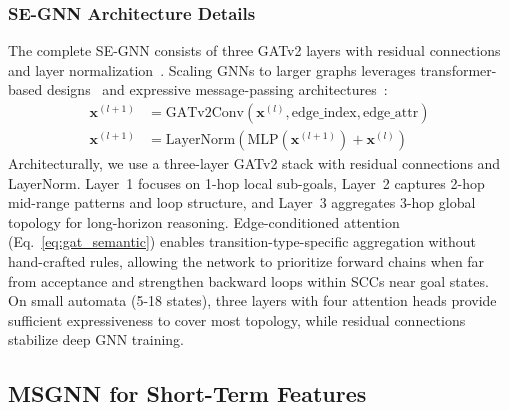 \documentclass[journal]{IEEEtran}
\begin{document}
\subsubsection{SE-GNN Architecture Details}

The complete SE-GNN consists of three GATv2 layers with residual connections~\citep{He2016} and layer normalization~\citep{Ba2016}. Scaling GNNs to larger graphs leverages transformer-based designs~\citep{rampavsek2022recipe} and expressive message-passing architectures~\citep{brandstetter2022message}:
\begin{align}
\mathbf{x}^{(l+1)} &= \text{GATv2Conv}(\mathbf{x}^{(l)}, \text{edge\_index}, \text{edge\_attr}) \\
\mathbf{x}^{(l+1)} &= \text{LayerNorm}(\text{MLP}(\mathbf{x}^{(l+1)}) + \mathbf{x}^{(l)})
\end{align}
Architecturally, we use a three-layer GATv2 stack with residual connections and LayerNorm. Layer~1 focuses on 1-hop local sub-goals, Layer~2 captures 2-hop mid-range patterns and loop structure, and Layer~3 aggregates 3-hop global topology for long-horizon reasoning. Edge-conditioned attention (Eq.~\ref{eq:gat_semantic}) enables transition-type-specific aggregation without hand-crafted rules, allowing the network to prioritize forward chains when far from acceptance and strengthen backward loops within SCCs near goal states. On small automata (5-18 states), three layers with four attention heads provide sufficient expressiveness to cover most topology, while residual connections stabilize deep GNN training.

\subsection{MSGNN for Short-Term Features}
\end{document}
